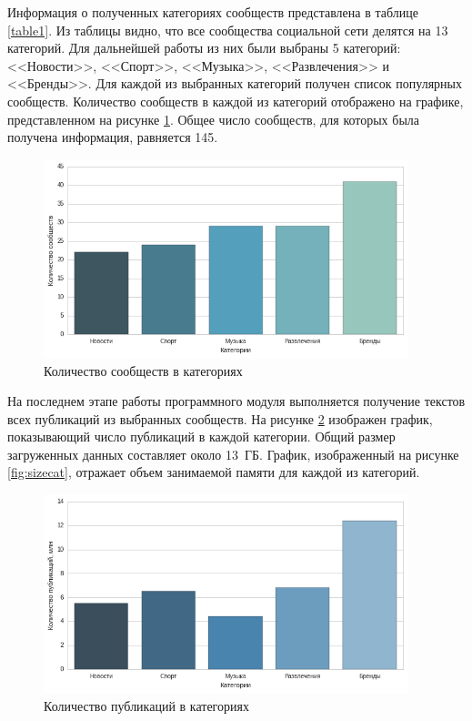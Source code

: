 \documentclass[a4paper]{report}
\begin{document}
	
	Информация о полученных категориях сообществ представлена в таблице \ref{table1}. Из таблицы видно, что все сообщества социальной сети делятся на 13 категорий. Для дальнейшей работы из них были выбраны 5 категорий: <<Новости>>, <<Спорт>>, <<Музыка>>, <<Развлечения>> и <<Бренды>>. Для каждой из выбранных категорий получен список популярных сообществ. Количество сообществ в каждой из категорий отображено на графике, представленном на рисунке \ref{fig:groupincat}. Общее число сообществ, для которых была получена информация, равняется 145. 
		\begin{figure}[h]
		\centering
		\includegraphics[width=400px]
		{imgs/GroupInCat.png}
		\caption{Количество сообществ в категориях}
		\label{fig:groupincat}
	\end{figure} 
	
	На последнем этапе работы программного модуля выполняется получение текстов всех публикаций из выбранных сообществ. На рисунке \ref{fig:numart} изображен график, показывающий число публикаций в каждой категории. 
	Общий размер загруженных данных составляет около 13~ГБ. 
	График, изображенный на рисунке \ref{fig:sizecat}, отражает объем занимаемой памяти для каждой из категорий. 
	
	
	\begin{figure}[h]
		\centering
		\includegraphics[width=400px]
		{imgs/NumArticles.png}
		\caption{Количество публикаций в категориях}
		\label{fig:numart}
	\end{figure} 
	
\end{document}
